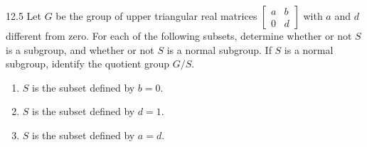 \documentclass[11pt]{article}
\begin{document}
\begin{exercise}{12.5}
Let $G$ be the group of upper triangular real matrices
$\begin{bmatrix}a&b\\0&d\end{bmatrix}$ with $a$ and $d$ different from
zero. For each of the following subsets, determine whether or not $S$ is
a subgroup, and whether or not $S$ is a normal subgroup. If $S$ is a
normal subgroup, identify the quotient group $G/S$.
\begin{enumerate}[label=\textbf{(\roman*)}]
  \item $S$ is the subset defined by $b=0$.
  \item $S$ is the subset defined by $d=1$.
  \item $S$ is the subset defined by $a=d$.
\end{enumerate}
\end{exercise}
\end{document}
